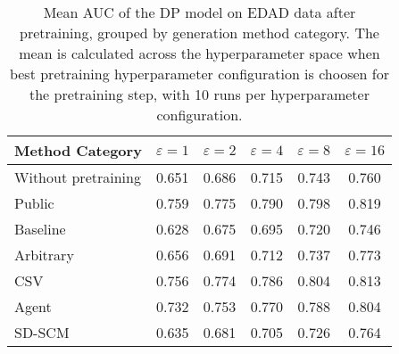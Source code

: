 \begin{table}[h!]
    \centering
    \caption{Mean AUC of the DP model on EDAD data after pretraining, grouped by generation method category. The mean is calculated across the hyperparameter space when best pretraining hyperparameter configuration is choosen for the pretraining step, with 10 runs per hyperparameter configuration.}
    \label{tab:epsilon_comparison}
    \begin{tabular}{lccccc}
    \toprule
    Method Category & $\varepsilon=1$ & $\varepsilon=2$ & $\varepsilon=4$ & $\varepsilon=8$ & $\varepsilon=16$ \\
    \midrule
    Without pretraining & 0.651 & 0.686 & 0.715 & 0.743 & 0.760 \\
    \arrayrulecolor{black!50!}\midrule
    Public & \cellcolor{gold!30}0.759 & \cellcolor{gold!30}0.775 & \cellcolor{gold!30}0.790 & \cellcolor{silver!30}0.798 & \cellcolor{gold!30}0.819 \\
    \arrayrulecolor{black!50!}\midrule
    Baseline & 0.628 & 0.675 & 0.695 & 0.720 & 0.746 \\
    \arrayrulecolor{black!50!}\midrule
    Arbitrary & 0.656 & 0.691 & 0.712 & 0.737 & 0.773 \\
    \arrayrulecolor{black!50!}\midrule
    CSV & \cellcolor{silver!30}0.756 & \cellcolor{silver!30}0.774 & \cellcolor{silver!30}0.786 & \cellcolor{gold!30}0.804 & \cellcolor{silver!30}0.813 \\
    Agent & \cellcolor{bronze!30}0.732 & \cellcolor{bronze!30}0.753 & \cellcolor{bronze!30}0.770 & \cellcolor{bronze!30}0.788 & \cellcolor{bronze!30}0.804 \\
    SD-SCM & 0.635 & 0.681 & 0.705 & 0.726 & 0.764 \\
    \bottomrule
    \end{tabular}
\end{table}